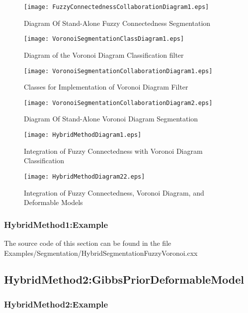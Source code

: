 \begin{figure}
\center
\texttt{[image: FuzzyConnectednessCollaborationDiagram1.eps]}
\caption{Diagram Of Stand-Alone Fuzzy Connectedness Segmentation}
\label{fig:UMLCollaborationDiagramoftherFuzzyConnectednessFilter}
\end{figure}

\begin{figure}
\center
\texttt{[image: VoronoiSegmentationClassDiagram1.eps]}
\caption{Diagram of the Voronoi Diagram Classification filter}
\label{fig:UMLVoronoiSegmentationClassFilter}
\end{figure}

\begin{figure}
\center
\texttt{[image: VoronoiSegmentationCollaborationDiagram1.eps]}
\caption{Classes for Implementation of Voronoi Diagram Filter}
\label{fig:UMLClassesforImplementationofVoronoiDiagramFilter}
\end{figure}


\begin{figure}
\center
\texttt{[image: VoronoiSegmentationCollaborationDiagram2.eps]}
\caption{Diagram Of Stand-Alone Voronoi Diagram Segmentation}
\label{fig:UMLCollaborationDiagramoftheVoronoiSegmentationFilter}
\end{figure}


\begin{figure}
\center
\texttt{[image: HybridMethodDiagram1.eps]}
\caption{Integration of Fuzzy Connectedness with Voronoi Diagram Classification}
\label{fig:UMLHybridMethodDiagram1}
\end{figure}

\begin{figure}
\center
\texttt{[image: HybridMethodDiagram22.eps]}
\caption{Integration of Fuzzy Connectedness, Voronoi Diagram, and Deformable Models}
\label{fig:UMLHybridMethodDiagram2}
\end{figure}



\subsubsection{HybridMethod1:Example}
\label{sec:HybridMethod1:Example}

The source code of this section can be found in the file 
Examples/Segmentation/HybridSegmentationFuzzyVoronoi.cxx




\subsection{HybridMethod2:GibbsPriorDeformableModel}
\label{sec:HybridMethod2}


\subsubsection{HybridMethod2:Example}
\label{sec:HybridMethod2:Example}

